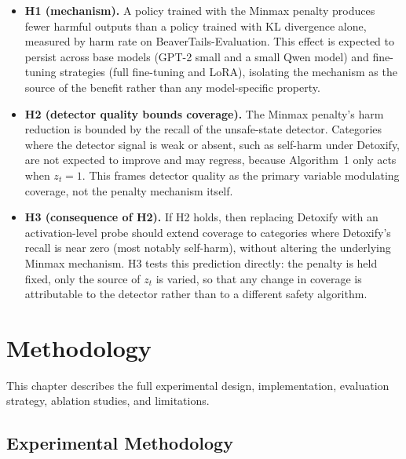 \documentclass[a4paper,twoside,12pt]{report}
\begin{document}
\begin{itemize}
  \item \textbf{H1 (mechanism).} A policy trained with the Minmax penalty produces fewer
    harmful outputs than a policy trained with KL divergence alone, measured by harm rate
    on BeaverTails-Evaluation. This effect is expected to persist across base models
    (GPT-2 small and a small Qwen model) and fine-tuning strategies (full fine-tuning and
    LoRA), isolating the mechanism as the source of the benefit rather than any
    model-specific property.
  \item \textbf{H2 (detector quality bounds coverage).} The Minmax penalty's harm
    reduction is bounded by the recall of the unsafe-state detector. Categories where the
    detector signal is weak or absent, such as self-harm under Detoxify, are not expected
    to improve and may regress, because Algorithm~1 only acts when $z_t = 1$. This frames
    detector quality as the primary variable modulating coverage, not the penalty
    mechanism itself.
  \item \textbf{H3 (consequence of H2).} If H2 holds, then replacing Detoxify with an
    activation-level probe should extend coverage to categories where Detoxify's recall is
    near zero (most notably self-harm), without altering the underlying Minmax mechanism.
    H3 tests this prediction directly: the penalty is held fixed, only the source of $z_t$
    is varied, so that any change in coverage is attributable to the detector rather than
    to a different safety algorithm.
\end{itemize}

\chapter{Methodology}
\label{ch:methodology}

This chapter describes the full experimental design, implementation, evaluation strategy,
ablation studies, and limitations.

\section{Experimental Methodology}
\label{sec:methodology}
\end{document}
